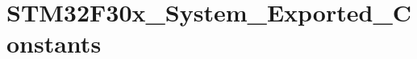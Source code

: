 \hypertarget{group___s_t_m32_f30x___system___exported___constants}{\section{S\-T\-M32\-F30x\-\_\-\-System\-\_\-\-Exported\-\_\-\-Constants}
\label{group___s_t_m32_f30x___system___exported___constants}
}
